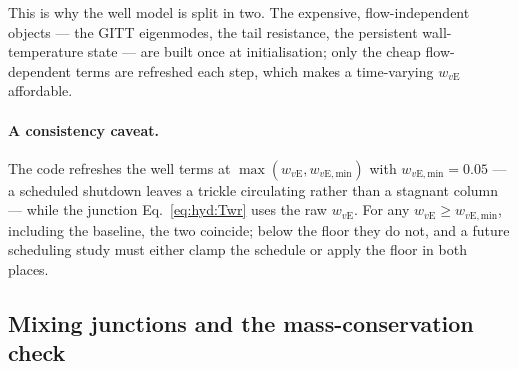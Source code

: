 \documentclass[11pt]{article}
\begin{document}
This is why the well model is split in two. The expensive, flow-independent objects --- the
GITT eigenmodes, the tail resistance, the persistent wall-temperature state --- are built once
at initialisation; only the cheap flow-dependent terms are refreshed each step, which makes a
time-varying $w_{v\mathrm{E}}$ affordable.

\paragraph{A consistency caveat.} The code refreshes the well terms at
$\max(w_{v\mathrm{E}},w_{v\mathrm{E,min}})$ with $w_{v\mathrm{E,min}}=\num{0.05}$ --- a
scheduled shutdown leaves a trickle circulating rather than a stagnant column --- while the
junction Eq.~\eqref{eq:hyd:Twr} uses the raw $w_{v\mathrm{E}}$. For any $w_{v\mathrm{E}}\ge
w_{v\mathrm{E,min}}$, including the baseline, the two coincide; below the floor they do not,
and a future scheduling study must either clamp the schedule or apply the floor in both places.

\subsection{Mixing junctions and the mass-conservation check}
\label{sec:hyd:mixing}
\end{document}
